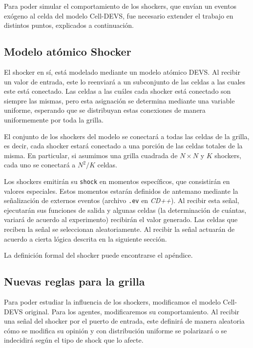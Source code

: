 Para poder simular el comportamiento de los shockers, que envían un eventos exógeno al celda del modelo Cell-DEVS, fue necesario extender el trabajo en distintos puntos, explicados a continuación.

\subsection{Modelo atómico Shocker}

El shocker en sí, está modelado mediante un modelo atómico DEVS. Al recibir un valor de entrada, este lo reenviará a un subconjunto de las celdas a las cuales este está conectado. Las celdas a las cuáles cada shocker está conectado son siempre las mismas, pero esta asignación se determina mediante una variable uniforme, esperando que se distribuyan estas conexiones de manera uniformemente por toda la grilla.

El conjunto de los shockers del modelo se conectará a todas las celdas de la grilla, es decir, cada shocker estará conectado a una porción de las celdas totales de la misma. En particular, si asumimos una grilla cuadrada de $N \times N$ y $K$ shockers, cada uno se conectará a $N^2/K$ celdas.

Los shockers emitirán su \texttt{shock} en momentos específicos, que consistirán en valores especiales. Estos momentos estarán definidos de antemano mediante la señalización de externos eventos (archivo \texttt{.ev} en \textit{CD++}). Al recibir esta señal, ejecutarán sus funciones de salida y algunas celdas (la determinación de cuántas, variará de acuerdo al experimento) recibirán el valor generado. Las celdas que reciben la señal se seleccionan aleatoriamente. Al recibir la señal actuarán de acuerdo a cierta lógica descrita en la siguiente sección.

La definición formal del shocker puede encontrarse el apéndice.

\subsection{Nuevas reglas para la grilla}

Para poder estudiar la influencia de los shockers, modificamos el modelo Cell-DEVS original. Para los agentes, modificaremos su comportamiento. Al recibir una señal del shocker por el puerto de entrada, este definirá de manera aleatoria cómo se modifica su opinión y con distribución uniforme se polarizará o se indecidirá según el tipo de shock que lo afecte.

